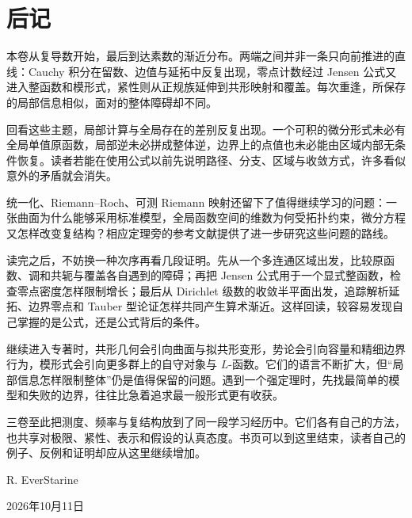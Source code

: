 \chapter*{后记}

本卷从复导数开始，最后到达素数的渐近分布。两端之间并非一条只向前推进的直线：Cauchy 积分在留数、边值与延拓中反复出现，零点计数经过 Jensen 公式又进入整函数和模形式，紧性则从正规族延伸到共形映射和覆盖。每次重逢，所保存的局部信息相似，面对的整体障碍却不同。

\ProseParagraphBreak

回看这些主题，局部计算与全局存在的差别反复出现。一个可积的微分形式未必有全局单值原函数，局部逆未必拼成整体逆，边界上的点值也未必能由区域内部无条件恢复。读者若能在使用公式以前先说明路径、分支、区域与收敛方式，许多看似意外的矛盾就会消失。

\ProseParagraphBreak

统一化、Riemann--Roch、可测 Riemann 映射还留下了值得继续学习的问题：一张曲面为什么能够采用标准模型，全局函数空间的维数为何受拓扑约束，微分方程又怎样改变复结构？相应定理旁的参考文献提供了进一步研究这些问题的路线。

\ProseParagraphBreak

读完之后，不妨换一种次序再看几段证明。先从一个多连通区域出发，比较原函数、调和共轭与覆盖各自遇到的障碍；再把 Jensen 公式用于一个显式整函数，检查零点密度怎样限制增长；最后从 Dirichlet 级数的收敛半平面出发，追踪解析延拓、边界零点和 Tauber 型论证怎样共同产生算术渐近。这样回读，较容易发现自己掌握的是公式，还是公式背后的条件。

\ProseParagraphBreak

继续进入专著时，共形几何会引向曲面与拟共形变形，势论会引向容量和精细边界行为，模形式会引向更多群上的自守对象与 \(L\)-函数。它们的语言不断扩大，但“局部信息怎样限制整体”仍是值得保留的问题。遇到一个强定理时，先找最简单的模型和失败的边界，往往比急着追求最一般形式更有收获。

\ProseParagraphBreak

三卷至此把测度、频率与复结构放到了同一段学习经历中。它们各有自己的方法，也共享对极限、紧性、表示和假设的认真态度。书页可以到这里结束，读者自己的例子、反例和证明却应从这里继续增加。

\bigskip
\begin{flushright}
R. EverStarine

2026年10月11日
\end{flushright}
